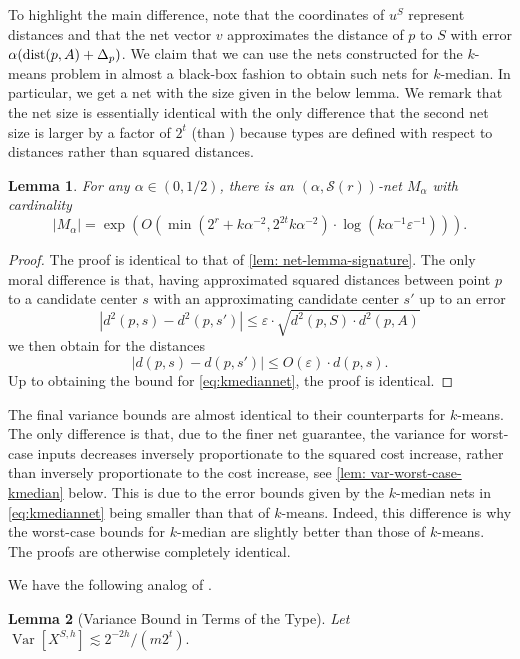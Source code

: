 \documentclass[11pt]{article}
\newtheorem{lemma}{Lemma}[section]
\theoremstyle{restate}
\theoremstyle{definition}
\newcommand{\eps}{\ensuremath{\varepsilon}}
\DeclareMathOperator*{\var}{\mathrm{Var}}
\newcommand{\dist}{\textnormal{dist}}
\begin{document}
To highlight the main difference, note that the coordinates of  $u^{S}$ represent distances and that the net vector $v$ approximates the distance of $p$ to $S$ with error $\alpha (\dist(p,A) + \Delta_p)$. We claim that we can use the nets constructed for the $k$-means problem in almost a black-box fashion to obtain such nets for $k$-median. In particular, we get a net with the size given in the below lemma. We remark that the net size is essentially identical with the only difference that the second net size is larger by a factor of $2^t$ (than ) because types are defined with respect to distances rather than squared distances.  \begin{lemma}\label{lem: net-lemma-k-median}
 For any $\alpha \in (0,1/2)$, there is an $(\alpha, \mathcal{S}(r))$-net $M_\alpha$ with cardinality \[|M_\alpha| = \exp(O(\min(2^r+ k\alpha^{-2}, 2^{2t} k \alpha^{-2})\cdot \log(k \alpha^{-1}{\eps^{-1}}))).\]
\end{lemma}
\begin{proof}
The proof is identical to that of \cref{lem: net-lemma-signature}. The only moral difference is that, having approximated squared distances between point $p$ to a candidate center $s$ with an approximating candidate center $s'$ up to an error 
\begin{equation}
\label{eq:kmediannet}
|d^2(p,s)-d^2(p,s')|\leq \varepsilon\cdot \sqrt{d^2(p,S)\cdot d^2(p,A)}    
\end{equation}
we then obtain for the distances
\[|d(p,s)-d(p,s')|\leq O(\varepsilon)\cdot d(p,s).\]
Up to obtaining the bound for \cref{eq:kmediannet}, the proof is identical.
\end{proof}

The final variance bounds are almost identical to their counterparts for $k$-means. The only difference is that, due to the finer net guarantee, the variance for worst-case inputs decreases inversely proportionate to the squared cost increase, rather than inversely proportionate to the cost increase, see \cref{lem: var-worst-case-kmedian}
below. This is due to the error bounds given by the $k$-median nets in \cref{eq:kmediannet} being smaller than that of $k$-means. 
Indeed, this difference is why the worst-case bounds for $k$-median are slightly better than those of $k$-means. The proofs are otherwise completely identical.


We have the following analog of .
\begin{lemma}[Variance Bound in Terms of the Type] \label{lem: var-easy-kmedian}Let 
$\var[X^{S,h}] \lesssim 2^{-2h}/(m2^t).$
\end{lemma}
\end{document}
